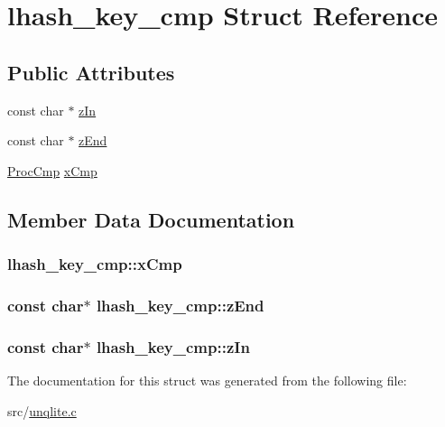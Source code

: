 \hypertarget{structlhash__key__cmp}{\section{lhash\-\_\-key\-\_\-cmp Struct Reference}
\label{d3/db3/structlhash__key__cmp}
}
\subsection*{Public Attributes}
\begin{DoxyCompactItemize}
\item 
const char $\ast$ \hyperlink{structlhash__key__cmp_a4d4d71b6547706ba89aebb475762a916}{z\-In}
\item 
const char $\ast$ \hyperlink{structlhash__key__cmp_a007e9b9763414ff14d31742fcc4cb79c}{z\-End}
\item 
\hyperlink{unqlite_8c_a60d84ee80a4995e96155889025d0603c}{Proc\-Cmp} \hyperlink{structlhash__key__cmp_af273c9fc0de7204ebaec1cb115c6d835}{x\-Cmp}
\end{DoxyCompactItemize}


\subsection{Member Data Documentation}
\hypertarget{structlhash__key__cmp_af273c9fc0de7204ebaec1cb115c6d835}{
\subsubsection[{x\-Cmp}]{ lhash\-\_\-key\-\_\-cmp\-::x\-Cmp}}\label{d3/db3/structlhash__key__cmp_af273c9fc0de7204ebaec1cb115c6d835}
\hypertarget{structlhash__key__cmp_a007e9b9763414ff14d31742fcc4cb79c}{
\subsubsection[{z\-End}]{\setlength{\rightskip}{0pt plus 5cm}const char$\ast$ lhash\-\_\-key\-\_\-cmp\-::z\-End}}\label{d3/db3/structlhash__key__cmp_a007e9b9763414ff14d31742fcc4cb79c}
\hypertarget{structlhash__key__cmp_a4d4d71b6547706ba89aebb475762a916}{
\subsubsection[{z\-In}]{\setlength{\rightskip}{0pt plus 5cm}const char$\ast$ lhash\-\_\-key\-\_\-cmp\-::z\-In}}\label{d3/db3/structlhash__key__cmp_a4d4d71b6547706ba89aebb475762a916}


The documentation for this struct was generated from the following file\-:\begin{DoxyCompactItemize}
\item 
src/\hyperlink{unqlite_8c}{unqlite.\-c}\end{DoxyCompactItemize}
